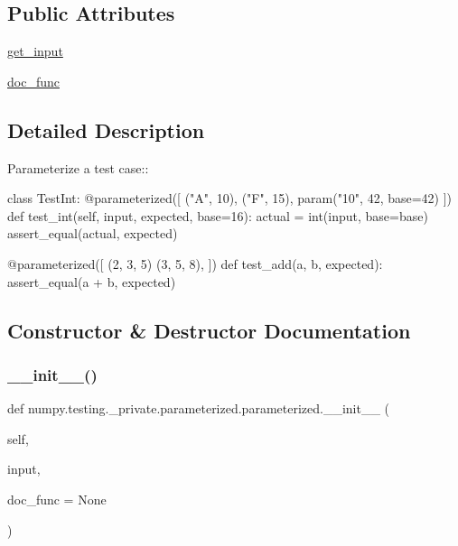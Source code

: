 \subsection*{Public Attributes}
\begin{DoxyCompactItemize}
\item 
\hyperlink{classnumpy_1_1testing_1_1__private_1_1parameterized_1_1parameterized_a0c27d341ee3a2178eacd020326c02269}{get\+\_\+input}
\item 
\hyperlink{classnumpy_1_1testing_1_1__private_1_1parameterized_1_1parameterized_a1107701ccce67924c8f473db0aa437e2}{doc\+\_\+func}
\end{DoxyCompactItemize}


\subsection{Detailed Description}
\begin{DoxyVerb}Parameterize a test case::

        class TestInt:
            @parameterized([
                ("A", 10),
                ("F", 15),
                param("10", 42, base=42)
            ])
            def test_int(self, input, expected, base=16):
                actual = int(input, base=base)
                assert_equal(actual, expected)

        @parameterized([
            (2, 3, 5)
            (3, 5, 8),
        ])
        def test_add(a, b, expected):
            assert_equal(a + b, expected)\end{DoxyVerb}
 

\subsection{Constructor \& Destructor Documentation}
\mbox{\label{classnumpy_1_1testing_1_1__private_1_1parameterized_1_1parameterized_a6cdd9fb0bb2817f59b25dea9f841d8f4}} 
\subsubsection{\texorpdfstring{\+\_\+\+\_\+init\+\_\+\+\_\+()}{\_\_init\_\_()}}
{\footnotesize\ttfamily def numpy.\+testing.\+\_\+private.\+parameterized.\+parameterized.\+\_\+\+\_\+init\+\_\+\+\_\+ (\begin{DoxyParamCaption}\item[{}]{self,  }\item[{}]{input,  }\item[{}]{doc\+\_\+func = {\ttfamily None} }\end{DoxyParamCaption})}



